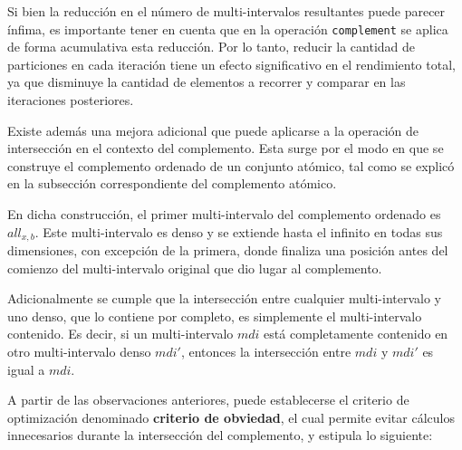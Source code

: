 Si bien la reducción en el número de multi-intervalos resultantes puede parecer ínfima, es importante tener en cuenta que en la operación \texttt{complement} se aplica de forma acumulativa esta reducción. Por lo tanto, reducir la cantidad de particiones en cada iteración tiene un efecto significativo en el rendimiento total, ya que disminuye la cantidad de elementos a recorrer y comparar en las iteraciones posteriores.

Existe además una mejora adicional que puede aplicarse a la operación de intersección en el contexto del complemento. Esta surge por el modo en que se construye el complemento ordenado de un conjunto atómico, tal como se explicó en la subsección correspondiente del complemento atómico.

En dicha construcción, el primer multi-intervalo del complemento ordenado es $\textit{all}_{x,b}$. Este multi-intervalo es denso y se extiende hasta el infinito en todas sus dimensiones, con excepción de la primera, donde finaliza una posición antes del comienzo del multi-intervalo original que dio lugar al complemento.

Adicionalmente se cumple que la intersección entre cualquier multi-intervalo y uno denso, que lo contiene por completo, es simplemente el multi-intervalo contenido. Es decir, si un multi-intervalo $mdi$ está completamente contenido en otro multi-intervalo denso $mdi'$, entonces la intersección entre $mdi$ y $mdi'$ es igual a $mdi$.

A partir de las observaciones anteriores, puede establecerse el criterio de optimización denominado \textbf{criterio de obviedad}, el cual permite evitar cálculos innecesarios durante la intersección del complemento, y estipula lo siguiente:

\begin{center}
\end{center}


